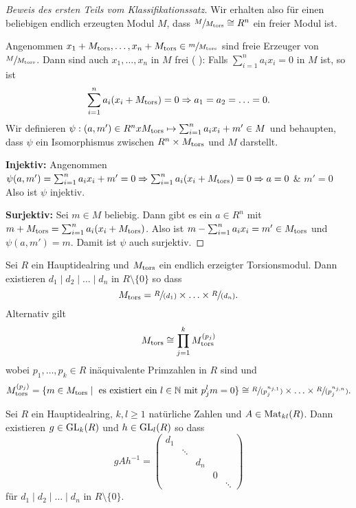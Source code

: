 \begin{proof}[Beweis des ersten Teils vom Klassifikationssatz]
	Wir erhalten also für einen beliebigen endlich erzeugten Modul $M$, dass $\sfrac{M}{M_{\operatorname{tors}}} \cong R^{n}$ ein freier Modul ist.

	Angenommen $x_1 + M_{\operatorname{tors}}, \ldots, x_{n} + M_{\operatorname{tors}} \in \sfrac{m}{M_{\operatorname{tors}}}$ sind freie Erzeuger von $\sfrac{M}{M_{\operatorname{tors}}}$.
	Dann sind auch $x_1,\ldots,x_{n}$ in $M$ frei (%
	): Falls $\sum_{i=1}^{n} a_{i} x_{i} = 0$ in $M$ ist, so ist
	\[
		\sum_{i=1}^{n} a_{i} (x_{i} + M_{\operatorname{tors}}) = 0 \Rightarrow a_1 = a_2 = \ldots = 0
	.\] 
	Wir definieren $\psi: (a,m') \in R^{n} x M_{\operatorname{tors}} \mapsto  \sum_{i=1}^{n} a_{i} x_{i} + m' \in M$ und behaupten,
	dass $\psi$ ein Isomorphismus zwischen $R^{n} \times M_{\operatorname{tors}}$ und $M$ darstellt.

	\textbf{Injektiv:} Angenommen $\psi(a,m') = \sum_{i=1}^{n} a_{i} x_{i} + m' = 0 \Rightarrow \sum_{i=1}^{n} a_{i} (x_{i} + M_{\operatorname{tors}}) = 0 \Rightarrow a = 0$ \& $m' = 0$ 
	Also ist $\psi$ injektiv.

	\textbf{Surjektiv:} Sei $m \in M$ beliebig. Dann gibt es ein $a \in R^{n}$ mit $m + M_{\operatorname{tors}} = \sum_{i=1}^{n} a_{i} (x_{i} + M_{\operatorname{tors}})$.
	Also ist $m - \sum_{i = 1}^{n} a_{i} x_{i} = m' \in M_{\operatorname{tors}}$ und $\psi(a,m') = m$.
	Damit ist $\psi$ auch surjektiv.
\end{proof}

\begin{theorem}
	Sei $R$ ein Hauptidealring und $M_{\operatorname{tors}}$ ein endlich erzeigter Torsionsmodul. 
	Dann existieren $d_1 \mid d_2 \mid \ldots \mid d_{n}$ in $R \setminus \{0\} $ so dass
	\[
		M_{\operatorname{tors}} = \sfrac{R}{(d_1)} \times \ldots \times \sfrac{R}{(d_{n})}
	.\] 
	Alternativ gilt
	\[
		M_{\operatorname{tors}} \cong \prod_{j=1}^{k} M_{\operatorname{tors}}^{(p_{j})}
	\]
	wobei $p_1,\ldots,p_{k} \in R$ inäquivalente Primzahlen in $R$ sind und %
	\[
		M_{\operatorname{tors}}^{(p_{j})} = \{m \in M_{\operatorname{tors}} \mid \text{ es existiert ein $l \in \mathbb{N}$ mit } p_{j}^{l} m = 0\} \cong 
		\sfrac{R}{(p_{j}^{n_{j,1}})} \times \ldots \times \sfrac{R}{(p_{j}^{n_{j,n}})}
	.\] 
\end{theorem}

\begin{theorem}
	Sei $R$ ein Hauptidealring, $k,l \geq 1$ natürliche Zahlen und $A \in \operatorname{Mat}_{kl}(R)$.
	Dann existieren $g \in \operatorname{GL}_{k}(R)$ und $h \in \operatorname{GL}_{l}(R)$ so dass
	\[
	g A h^{-1} = \begin{pmatrix} 
		d_1 \\
		& \ddots \\
		& & d_{n} \\
		& & & 0 \\
		& & & & \ddots
	\end{pmatrix} 
	\]
	für $d_1 \mid d_2 \mid \ldots \mid d_{n}$ in $R \setminus \{0\} $.
\end{theorem}

